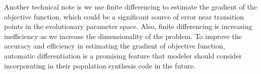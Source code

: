 \documentclass[twocolumn]{aastex631}
\begin{document}


Another technical note is we use finite differencing to estimate the gradient of the objective function, which could be a significant source of error near transition points in the evolutionary parameter space.
Also, finite differencing is increasing inefficiency as we increase the dimensionality of the problem.
To improve the accuracy and efficiency in estimating the gradient of objective function, automatic differentiation is a promising feature that modeler should consider incorporating in their population synthesis code in the future.
\end{document}
